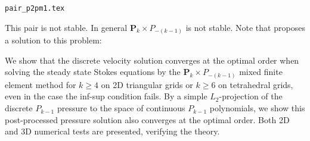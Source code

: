 \begin{flushright} {\tiny {\color{gray} \tt pair\_p2pm1.tex}} \end{flushright}


This pair is not stable. In general ${\bm P}_k \times P_{-(k-1)}$ is not stable. 
Note that \textcite{zhan24} proposes a solution to this problem:
\begin{displayquote}
{\color{darkgray}
We show that the discrete velocity solution converges at
the optimal order when solving the steady state Stokes
equations by the ${\bm P}_k\times P_{-(k-1)}$ mixed finite element method for
$k \ge 4$ on 2D triangular grids or $k \ge 6$ on tetrahedral grids,
even in the case the inf-sup condition fails. By a simple
$L_2$-projection of the discrete $P_{k-1}$ pressure to the space of
continuous $P_{k-1}$ polynomials, we show this post-processed
pressure solution also converges at the optimal order. Both
2D and 3D numerical tests are presented, verifying the
theory.
}
\end{displayquote}


